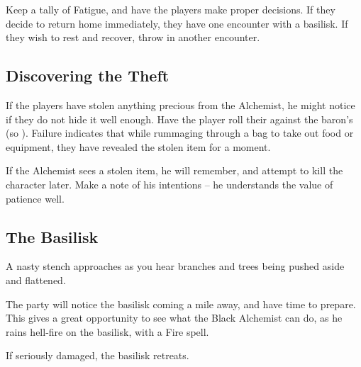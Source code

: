 \begin{multicols}{2}

\noindent
Keep a tally of Fatigue, and have the players make proper decisions.
If they decide to return home immediately, they have one encounter with a basilisk.
If they wish to rest and recover, throw in another encounter.

\subsection{Discovering the Theft}

If the players have stolen anything precious from the Alchemist, he might notice if they do not hide it well enough.
Have the player roll their  against the baron's  (so \tn).
Failure indicates that while rummaging through a bag to take out food or equipment, they have revealed the stolen item for a moment.

If the Alchemist sees a stolen item, he will remember, and attempt to kill the character later.
Make a note of his intentions -- he understands the value of patience well.

\subsection{The Basilisk}

\begin{boxtext}

  A nasty stench approaches as you hear branches and trees being pushed aside and flattened.

\end{boxtext}

The party will notice the basilisk coming a mile away, and have time to prepare.
This gives a great opportunity to see what the Black Alchemist can do, as he rains hell-fire on the basilisk, with a Fire spell.

\basilisk

If seriously damaged, the basilisk retreats.

\end{multicols}
